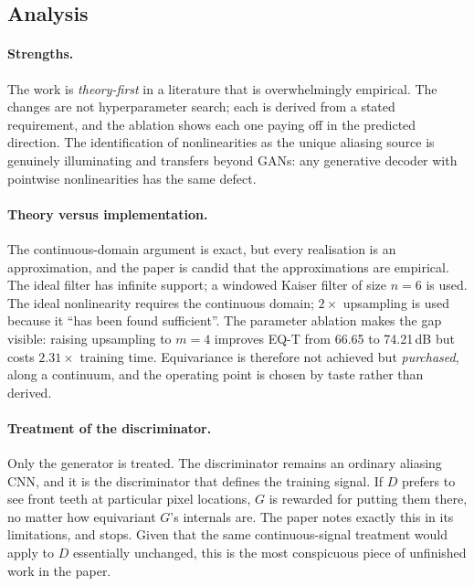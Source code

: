 \documentclass[11pt,a4paper]{article}
\begin{document}
\subsection{Analysis}

\paragraph{Strengths.} The work is \emph{theory-first} in a literature that
is overwhelmingly empirical. The changes are not hyperparameter search; each is
derived from a stated requirement, and the ablation shows each one paying off in
the predicted direction. The identification of nonlinearities as the unique
aliasing source is genuinely illuminating and transfers beyond GANs: any
generative decoder with pointwise nonlinearities has the same defect.

\paragraph{Theory versus implementation.} The continuous-domain
argument is exact, but every realisation is an approximation, and the paper is
candid that the approximations are empirical. The ideal filter has infinite
support; a windowed Kaiser filter of size $n=6$ is used. The ideal nonlinearity
requires the continuous domain; $2\times$ upsampling is used because it ``has
been found sufficient''. The parameter ablation makes the gap visible: raising
upsampling to $m=4$ improves EQ-T from 66.65 to 74.21\,dB but costs $2.31\times$
training time. Equivariance is therefore not achieved but \emph{purchased}, along
a continuum, and the operating point is chosen by taste rather than derived.

\paragraph{Treatment of the discriminator.} Only the
generator is treated. The discriminator remains an ordinary aliasing CNN, and it
is the discriminator that defines the training signal. If $D$ prefers to see
front teeth at particular pixel locations, $G$ is rewarded for putting them
there, no matter how equivariant $G$'s internals are. The paper notes exactly this
in its limitations, and stops. Given that the same continuous-signal treatment
would apply to $D$ essentially unchanged, this is the most conspicuous piece of
unfinished work in the paper.

\end{document}
